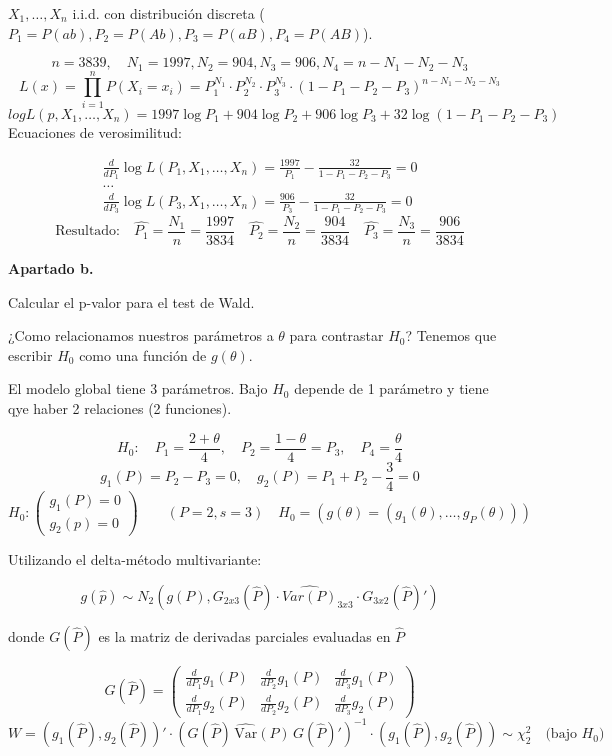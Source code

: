 $X_1,\dots,X_n$ i.i.d. con distribución discreta ($P_1=P(ab),P_2=P(Ab),P_3=P(aB),P_4=P(AB)$).

\[
n=3839, \quad N_1=1997,N_2=904, N_3=906, N_4=n-N_1-N_2-N_3
\]
\[
L(x)=\prod_{i=1}^{n}P(X_i=x_i)=P_1^{N_1}\cdot P_2^{N_2}\cdot P_3^{N_3}\cdot (1-P_1-P_2-P_3)^{n-N_1-N_2-N_3}
\]
\[
log L(p,X_1,\dots,X_n)=1997 \log P_1+ 904 \log P_2+906 \log P_3+32\log(1-P_1-P_2-P_3)
\]
\newpage
Ecuaciones de verosimilitud:

\[
\begin{matrix}
    \frac{d}{d P_1} \log L(P_1, X_1, \dots, X_n) = \frac{1997}{P_1} - \frac{32}{1 - P_1 - P_2 - P_3} = 0 \\[1em]
    \dots \\[1em]
    \frac{d}{d P_3} \log L(P_3, X_1, \dots, X_n) = \frac{906}{P_3} - \frac{32}{1 - P_1 - P_2 - P_3} = 0
\end{matrix}
\]
\[
    \text{Resultado:}\quad \hat{P_1}=\frac{N_1}{n}=\frac{1997}{3834} \quad \hat{P_2}=\frac{N_2}{n}=\frac{904}{3834} \quad \hat{P_3}=\frac{N_3}{n}=\frac{906}{3834}
\]

\textbf{Apartado b.}

Calcular el p-valor para el test de Wald.

¿Como relacionamos nuestros parámetros a $\theta$ para contrastar $H_0$? Tenemos que escribir $H_0$ como una función de $g(\theta)$.

El modelo global tiene 3 parámetros. Bajo $H_0$ depende de 1 parámetro y tiene qye haber 2 relaciones (2 funciones).

\[
H_0: \quad P_1=\frac{2+\theta}{4}, \quad P_2=\frac{1-\theta}{4}=P_3, \quad P_4=\frac{\theta}{4}
\]\[g_1(P)=P_2-P_3=0, \quad g_2(P)=P_1+P_2-\frac{3}{4}=0
\]\[H_0:
\begin{pmatrix}
    g_1(P)=0 \\
    g_2(p)=0
\end{pmatrix} \qquad (P=2,s=3) \quad H_0=(g(\theta)=(g_1(\theta),\dots,g_P(\theta)))
\]

Utilizando el delta-método multivariante:

\[
g(\hat{p})\sim N_2(g(P),G_{2x3}(\hat{P})\cdot \hat{Var(P)}_{3x3} \cdot G_{3x2}(\hat{P})')
\]

donde $G(\hat{P})$ es la matriz de derivadas parciales evaluadas en $\hat{P}$

\[
G(\hat{P})=
\begin{pmatrix}
    \frac{d}{d P_1} g_1(P) & \frac{d}{d P_2} g_1(P) & \frac{d}{d P_3} g_1(P) \\
    \frac{d}{d P_1} g_2(P) & \frac{d}{d P_2} g_2(P) & \frac{d}{d P_3} g_2(P) 
\end{pmatrix}
\]
\[
W = \left( g_1(\hat{P}), g_2(\hat{P}) \right)' \cdot \left( G(\hat{P}) \, \hat{\text{Var}}(P) \, G(\hat{P})' \right)^{-1} \cdot \left( g_1(\hat{P}), g_2(\hat{P}) \right) \sim \chi^2_2 \quad \text{(bajo } H_0\text{)}
\]

